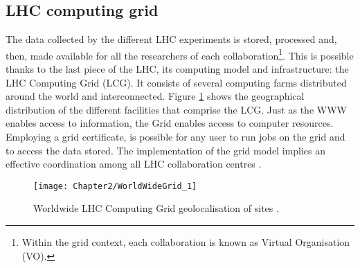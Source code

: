 \subsection{LHC computing grid}
\label{sec:Chap2:LHC:LCG}
The data collected by the different LHC experiments is stored, processed and, then, made available for all the researchers of each collaboration\footnote{Within the grid context, 
each collaboration is known as Virtual Organisation (VO).}.
This is possible thanks to the last piece of the LHC, its computing model and infrastructure: the LHC Computing Grid (LCG). It consists
of several computing farms distributed around the world and interconnected. Figure \ref{fig:Chap2:LHC_Grid} shows the geographical distribution of the different facilities that comprise the LCG.
Just as the WWW enables access to information, the Grid enables access to computer resources. Employing a grid certificate, is possible for any user to run jobs
on the grid and to access the data stored. The implementation of the grid model implies an effective coordination among all LHC collaboration centres \cite{Bird:2005js}. 

	\begin{figure}
 	  \centering
 	  \texttt{[image: Chapter2/WorldWideGrid\_1]}
	  \caption{Worldwide LHC Computing Grid geolocalisation of sites \cite{CERN_LHCG_locations}.}
	  \label{fig:Chap2:LHC_Grid}
	\end{figure}

